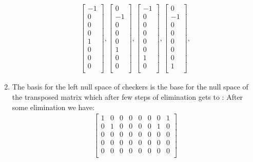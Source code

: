 \documentclass[a4paper,11pt]{article}
\begin{document}
\begin{enumerate}
\begin{align*}
\begin{bmatrix}
-1 \\
0 \\
0 \\
0 \\
1 \\
0 \\
0 \\
0 \\
\end{bmatrix},
\begin{bmatrix}
0 \\
-1 \\
0 \\
0 \\
0 \\
1 \\
0 \\
0 \\
\end{bmatrix},
\begin{bmatrix}
-1 \\
0 \\
0 \\
0 \\
0 \\
0 \\
1 \\
0 \\
\end{bmatrix},
\begin{bmatrix}
0 \\
-1 \\
0 \\
0 \\
0 \\
0 \\
0 \\
1 \\
\end{bmatrix},
\end{align*}
\item The basis for the left null space of checkers is the base for the null space of the transposed matrix which after few steps of elimination gets to :
After some elimination we have:
\begin{align*}
\begin{bmatrix}
1 & 0 & 0 & 0 & 0 & 0 & 0 & 1 \\
0 & 1 & 0 & 0 & 0 & 0 & 1 & 0 \\
0 & 0 & 0 & 0 & 0 & 0 & 0 & 0 \\
0 & 0 & 0 & 0 & 0 & 0 & 0 & 0 \\
0 & 0 & 0 & 0 & 0 & 0 & 0 & 0 \\

\end{bmatrix}
\end{align*}
\end{enumerate}
\end{document}
